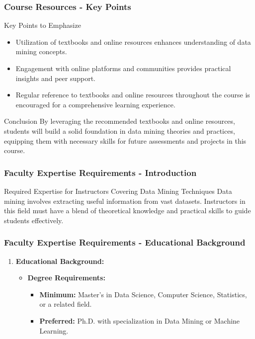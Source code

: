 \documentclass[aspectratio=169]{beamer}
\begin{document}
\begin{frame}[fragile]
    \frametitle{Course Resources - Key Points}
    \begin{block}{Key Points to Emphasize}
        \begin{itemize}
            \item Utilization of textbooks and online resources enhances understanding of data mining concepts.
            \item Engagement with online platforms and communities provides practical insights and peer support.
            \item Regular reference to textbooks and online resources throughout the course is encouraged for a comprehensive learning experience.
        \end{itemize}
    \end{block}

    \begin{block}{Conclusion}
        By leveraging the recommended textbooks and online resources, students will build a solid foundation in data mining theories and practices, equipping them with necessary skills for future assessments and projects in this course.
    \end{block}
\end{frame}

\begin{frame}[fragile]
  \frametitle{Faculty Expertise Requirements - Introduction}
  \begin{block}{Required Expertise for Instructors Covering Data Mining Techniques}
    Data mining involves extracting useful information from vast datasets. Instructors in this field must have a blend of theoretical knowledge and practical skills to guide students effectively.
  \end{block}
\end{frame}

\begin{frame}[fragile]
  \frametitle{Faculty Expertise Requirements - Educational Background}
  \begin{enumerate}
    \item \textbf{Educational Background:}
      \begin{itemize}
        \item \textbf{Degree Requirements:}
          \begin{itemize}
            \item \textbf{Minimum:} Master’s in Data Science, Computer Science, Statistics, or a related field.
            \item \textbf{Preferred:} Ph.D. with specialization in Data Mining or Machine Learning.
          \end{itemize}
      \end{itemize}
  \end{enumerate}
\end{frame}
\end{document}
